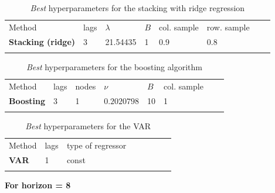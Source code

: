 \begin{table}[!htb]
\begin{center}
\caption{\textit{Best} hyperparameters for the stacking with ridge regression}
\label{tab:bestparamsbagrvfl}       %
\begin{tabular}{llllllll}
\hline\noalign{\smallskip}
Method & lags & $\lambda$ & $B$ & col. sample  &  row. sample  \\
\noalign{\smallskip}\hline\noalign{\smallskip}
  \textbf{Stacking (ridge)} & 3 & 21.54435 &  1 & 0.9 & 0.8   \\
\noalign{\smallskip}\hline
\end{tabular}
\end{center}
\end{table}

\begin{table}[!htb]
\begin{center}
\caption{\textit{Best} hyperparameters for the boosting algorithm}
\label{tab:bestparamsbagrvfl}       %
\begin{tabular}{llllllll}
\hline\noalign{\smallskip}
Method & lags & nodes & $\nu$ & $B$ & col. sample  &  & \\
\noalign{\smallskip}\hline\noalign{\smallskip}
  \textbf{Boosting} & 3 & 1 & $0.2020798$ & 10 & 1 & & \\
\noalign{\smallskip}\hline
\end{tabular}
\end{center}
\end{table}

\begin{table}[!htb]
\begin{center}
\caption{\textit{Best} hyperparameters for the VAR}
\label{tab:bestparamsvar}       %
\begin{tabular}{llllllll}
\hline\noalign{\smallskip}
Method & lags & type of regressor &  &  &  &  & \\
\noalign{\smallskip}\hline\noalign{\smallskip}
  \textbf{VAR} & 1 & const &  & &  & & \\
\noalign{\smallskip}\hline
\end{tabular}
\end{center}
\end{table}


\textbf{For horizon = 8}

